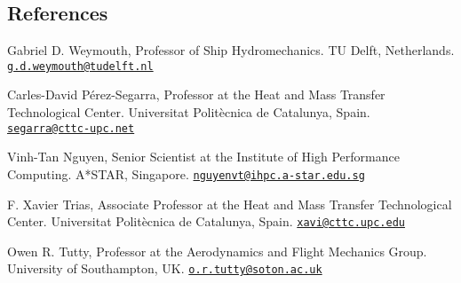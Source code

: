 \documentclass[line]{res}
\newenvironment{p1}
  {\begin{adjustwidth}{-16pt}{0pt}
  \vspace{1pt}}
  {\end{adjustwidth}}
\begin{document}
\begin{resume}
\section{References}\vspace{0.2cm}
\begin{p1}\setlength{\parskip}{1em}
Gabriel D. Weymouth, Professor of Ship Hydromechanics.\newline
TU Delft, Netherlands.\newline
\href{mailto:g.d.weymouth@tudelft.nl}{\texttt{g.d.weymouth@tudelft.nl}}

Carles-David P\'{e}rez-Segarra, Professor at the Heat and Mass Transfer Technological Center.\newline
Universitat Polit\`{e}cnica de Catalunya, Spain.\newline
\href{mailto:segarra@cttc-upc.net}{\texttt{segarra@cttc-upc.net}}

Vinh-Tan Nguyen, Senior Scientist at the Institute of High Performance Computing.\newline
A*STAR, Singapore.\newline
\href{mailto:nguyenvt@ihpc.a-star.edu.sg}{\texttt{nguyenvt@ihpc.a-star.edu.sg}}

F. Xavier Trias, Associate Professor at the Heat and Mass Transfer Technological Center.\newline
Universitat Polit\`{e}cnica de Catalunya, Spain.\newline
\href{mailto:xavi@cttc.upc.edu}{\texttt{xavi@cttc.upc.edu}}

Owen R. Tutty, Professor at the Aerodynamics and Flight Mechanics Group.\newline
University of Southampton, UK.\newline
\href{mailto:o.r.tutty@soton.ac.uk}{\texttt{o.r.tutty@soton.ac.uk}}
\end{p1}
\end{resume}
\end{document}
